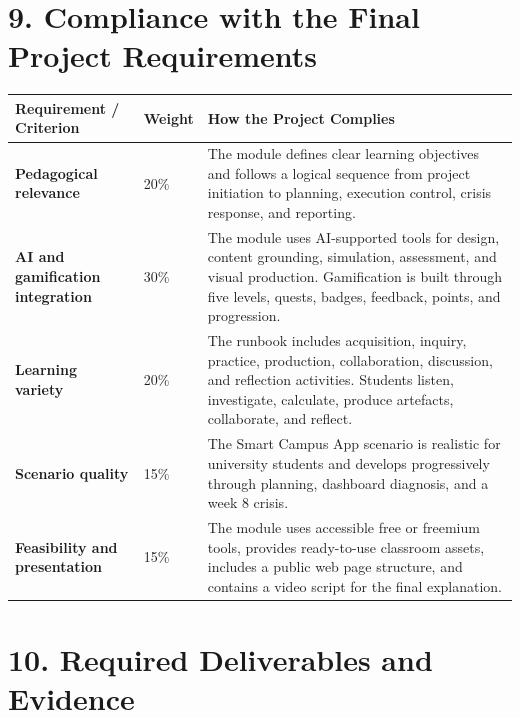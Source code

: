 \documentclass[11pt,a4paper]{article}
\begin{document}
\section*{9. Compliance with the Final Project Requirements}

\begin{longtable}{>{\bfseries}p{4.3cm}p{2cm}p{8cm}}
\textbf{Requirement / Criterion} & \textbf{Weight} & \textbf{How the Project Complies} \\
\hline
Pedagogical relevance & 20\% & The module defines clear learning objectives and follows a logical sequence from project initiation to planning, execution control, crisis response, and reporting. \\
AI and gamification integration & 30\% & The module uses AI-supported tools for design, content grounding, simulation, assessment, and visual production. Gamification is built through five levels, quests, badges, feedback, points, and progression. \\
Learning variety & 20\% & The runbook includes acquisition, inquiry, practice, production, collaboration, discussion, and reflection activities. Students listen, investigate, calculate, produce artefacts, collaborate, and reflect. \\
Scenario quality & 15\% & The Smart Campus App scenario is realistic for university students and develops progressively through planning, dashboard diagnosis, and a week 8 crisis. \\
Feasibility and presentation & 15\% & The module uses accessible free or freemium tools, provides ready-to-use classroom assets, includes a public web page structure, and contains a video script for the final explanation. \\
\end{longtable}

\section*{10. Required Deliverables and Evidence}
\end{document}
